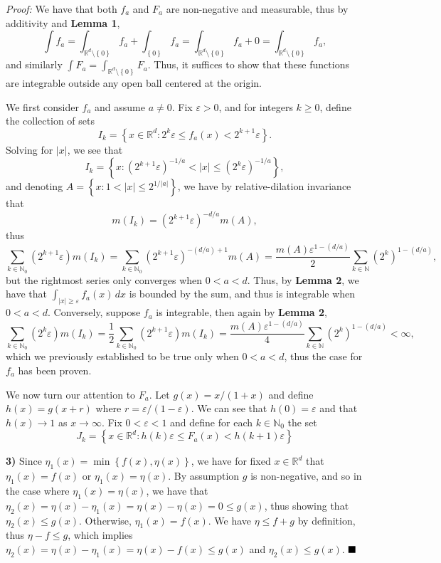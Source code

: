 \documentclass[12pt]{article}
\newcommand{\N}{\ensuremath{\mathbb{N}}}
\newcommand{\R}{\ensuremath{\mathbb{R}}}
\newcommand{\e}{\ensuremath{\varepsilon}}
\newcommand{\braceb}[1]{\left\{#1\right\}}
\newcommand{\vertb}[1]{\left\vert#1\right\vert}
\newcommand{\sdiff}{\setminus}
\newcommand{\proof}{\textit{Proof: }}
\newcommand{\done}{\ensuremath{\strut\hfill\blacksquare}}
\begin{document}
\proof
We have that both \( f_a \) and \( F_a \) are non-negative and measurable,
thus by additivity and \textbf{Lemma 1},
\[
	\int f_a
	= \int_{\R^d \sdiff \braceb{0}} f_a + \int_{\braceb{0}} f_a
	= \int_{\R^d \sdiff \braceb{0}} f_a + 0
	= \int_{\R^d \sdiff \braceb{0}} f_a,
\]
and similarly \( \int F_a = \int_{\R^d \sdiff \braceb{0}} F_a \).
Thus, it suffices to show that these functions are integrable outside any open
ball centered at the origin.

We first consider \( f_a \) and assume \( a \ne 0 \).
Fix \( \e > 0 \), and for integers \( k \geq 0 \), define the collection of sets
\[
	I_k = \braceb{x \in \R^d : 2^k\e \leq f_a(x) < 2^{k + 1}\e}.
\]
Solving for \( \vertb{x} \), we see that
\[
	I_k = \braceb{x : (2^{k + 1}\e)^{-1/a} < \vertb{x} \leq (2^k\e)^{-1/a}},
\]
and denoting \( A = \braceb{x : 1 < \vertb{x} \leq 2^{1/\vertb{a}}} \), we have
by relative-dilation invariance that
\[
	m(I_k) = (2^{k + 1}\e)^{-d/a} m(A),
\]
thus
\[
	\sum_{k \in \N_0} (2^{k + 1}\e) m(I_k)
	= \sum_{k \in \N_0} (2^{k + 1}\e)^{-(d/a) + 1}m(A)
	= \frac{m(A)\e^{1 - (d/a)}}{2} \sum_{k \in \N} (2^k)^{1 - (d/a)},
\]
but the rightmost series only converges when \( 0 < a < d \).
Thus, by \textbf{Lemma 2}, we have that
\( \int_{\vertb{x} \geq \e} f_a(x) \, dx \) is bounded by the sum, and thus is
integrable when \( 0 < a < d \).
Conversely, suppose \( f_a \) is integrable, then again by \textbf{Lemma 2},
\[
	\sum_{k \in \N_0} (2^k\e) m(I_k)
	= \frac{1}{2} \sum_{k \in \N_0} (2^{k + 1}\e) m(I_k)
	= \frac{m(A)\e^{1 - (d/a)}}{4} \sum_{k \in \N} (2^k)^{1 - (d/a)}
	< \infty,
\]
which we previously established to be true only when \( 0 < a < d \), thus the
case for \( f_a \) has been proven.

We now turn our attention to \( F_a \).
Let \( g(x) = x/(1 + x) \) and define \( h(x) = g(x + r) \) where
\( r = \e/(1 - \e) \).
We can see that \( h(0) = \e \) and that \( h(x) \to 1 \) as \( x \to \infty \).
Fix \( 0 < \e < 1 \) and define for each \( k \in \N_0 \) the set
\[
	J_k
	= \braceb{x \in \R^d : h(k)\e \leq F_a(x) < h(k + 1)\e}
\]


\textbf{3)}
Since \( \eta_1(x) = \min\braceb{f(x), \eta(x)} \), we have for fixed
\( x \in \R^d \) that \( \eta_1(x) = f(x) \) or \( \eta_1(x) = \eta(x) \).
By assumption \( g \) is non-negative, and so in the case where
\( \eta_1(x) = \eta(x) \), we have that
\( \eta_2(x) = \eta(x) - \eta_1(x) = \eta(x) - \eta(x) = 0 \leq g(x) \), thus
showing that \( \eta_2(x) \leq g(x) \).
Otherwise, \( \eta_1(x) = f(x) \).
We have \( \eta \leq f + g \) by definition, thus \( \eta - f \leq g \), which
implies \( \eta_2(x) = \eta(x) - \eta_1(x) = \eta(x) - f(x) \leq g(x) \) and
\( \eta_2(x) \leq g(x) \).
\done
\end{document}
